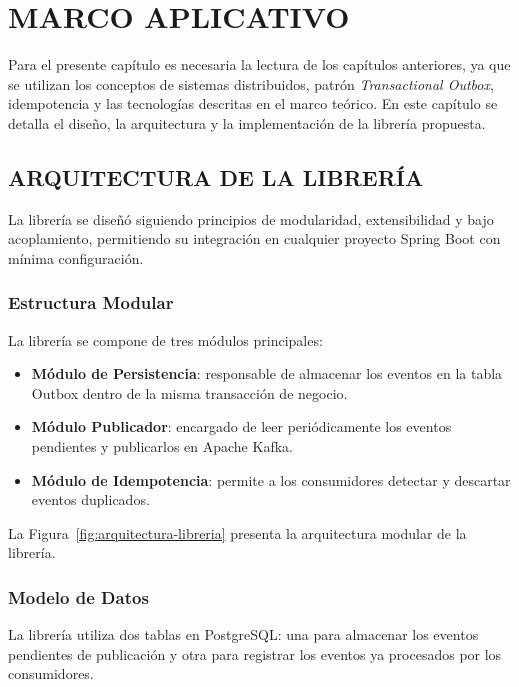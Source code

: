 \clearpage
\chapter{MARCO APLICATIVO}

Para el presente capítulo es necesaria la lectura de los capítulos anteriores, ya que se utilizan los conceptos de sistemas distribuidos, patrón \textit{Transactional Outbox}, idempotencia y las tecnologías descritas en el marco teórico. En este capítulo se detalla el diseño, la arquitectura y la implementación de la librería propuesta.

\section{ARQUITECTURA DE LA LIBRERÍA}

La librería se diseñó siguiendo principios de modularidad, extensibilidad y bajo acoplamiento, permitiendo su integración en cualquier proyecto Spring Boot con mínima configuración.

\subsection{Estructura Modular}

La librería se compone de tres módulos principales:

\begin{itemize}
    \item \textbf{Módulo de Persistencia}: responsable de almacenar los eventos en la tabla Outbox dentro de la misma transacción de negocio.
    \item \textbf{Módulo Publicador}: encargado de leer periódicamente los eventos pendientes y publicarlos en Apache Kafka.
    \item \textbf{Módulo de Idempotencia}: permite a los consumidores detectar y descartar eventos duplicados.
\end{itemize}

La Figura~\ref{fig:arquitectura-libreria} presenta la arquitectura modular de la librería.



\subsection{Modelo de Datos}

La librería utiliza dos tablas en PostgreSQL: una para almacenar los eventos pendientes de publicación y otra para registrar los eventos ya procesados por los consumidores.


